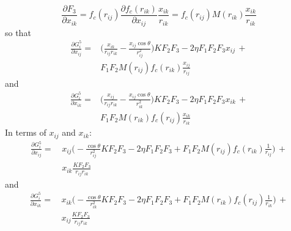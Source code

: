 \documentclass[twoside,english]{uiofysmaster}
\begin{document}
\begin{appendices}
\begin{equation}
  \frac{\partial F_3}{\partial x_{ik}} = f_c(r_{ij})
 \frac{\partial f_c(r_{ik})}{\partial x_{ij}}\frac{x_{ik}}{r_{ik}} = 
 f_c(r_{ij})M(r_{ik})\frac{x_{ik}}{r_{ik}}
\end{equation}
so that
\begin{align}
 \frac{\partial G_i^5}{\partial x_{ij}} = &\biggr(\frac{x_{ik}}{r_{ij}r_{ik}} - \frac{x_{ij}\cos\theta}{r_{ij}^2}
 \biggr)KF_2F_3 -
 2\eta F_1 F_2F_3 x_{ij} \, + \\
 &F_1F_2 M(r_{ij})f_c(r_{ik})\frac{x_{ij}}{r_{ij}}
\end{align}
and 
\begin{align}
 \frac{\partial G_i^5}{\partial x_{ik}} = &\biggr(\frac{x_{ij}}{r_{ij}r_{ik}} - \frac{x_{ij}\cos\theta}{r_{ik}^2}
 \biggr)KF_2F_3 -
 2\eta F_1 F_2F_3 x_{ik} \, + \\
 &F_1F_2 M(r_{ik})f_c(r_{ij})\frac{x_{ik}}{r_{ik}}
\end{align}
In terms of $x_{ij}$ and $x_{ik}$:
\begin{align}
 \frac{\partial G_i^5}{\partial x_{ij}} = \, &x_{ij} \biggr(-\frac{\cos\theta}{r_{ij}^2}K
 F_2F_3 - 2\eta F_1F_2F_3 + F_1F_2M(r_{ij})f_c(r_{ik})\frac{1}{r_{ij}} \biggr) \, + \\
 &x_{ik}\frac{KF_2F_3}{r_{ij}r_{ik}}
\end{align}
and 
\begin{align}
 \frac{\partial G_i^5}{\partial x_{ik}} = \, &x_{ik} \biggr(-\frac{\cos\theta}{r_{ik}^2}K
 F_2F_3 - 2\eta F_1F_2F_3 + F_1F_2M(r_{ik})f_c(r_{ij})\frac{1}{r_{ik}} \biggr) \, + \\
 &x_{ij}\frac{KF_2F_3}{r_{ij}r_{ik}}
\end{align}


\end{appendices}





\newpage
\end{document}
